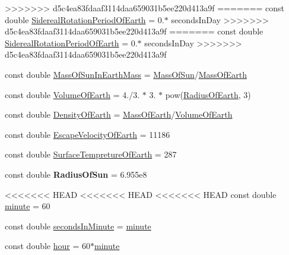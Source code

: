 \begin{DoxyCompactItemize}
>>>>>>> d5c4ea83fdaaf3114daa659031b5ee220d413a9f
=======
const double \hyperlink{namespace_e_g_x_phys_a34a388ac3f9196bb3cdbdbee5ff3cdb7}{Sidereal\+Rotation\+Period\+Of\+Earth} = 0.$\ast$ seconds\+In\+Day
>>>>>>> d5c4ea83fdaaf3114daa659031b5ee220d413a9f
=======
const double \hyperlink{namespace_e_g_x_phys_a34a388ac3f9196bb3cdbdbee5ff3cdb7}{Sidereal\+Rotation\+Period\+Of\+Earth} = 0.$\ast$ seconds\+In\+Day
>>>>>>> d5c4ea83fdaaf3114daa659031b5ee220d413a9f
\item 
const double \hyperlink{namespace_e_g_x_phys_a05709972a6a6089eb968f667ce0bf656}{Mass\+Of\+Sun\+In\+Earth\+Mass} = \hyperlink{namespace_e_g_x_phys_a6e84ae13f1dbcecb215af787bbc12cd6}{Mass\+Of\+Sun}/\hyperlink{namespace_e_g_x_phys_ace4a9d8c0b21215536857f4c1087a4e8}{Mass\+Of\+Earth}
\item 
const double \hyperlink{namespace_e_g_x_phys_a73aaaddeacf5d59643ec5e4a53a1a251}{Volume\+Of\+Earth} = 4./3. $\ast$ 3. $\ast$ pow(\hyperlink{namespace_e_g_x_phys_a11a2d4a914eb43c4095e225358293a45}{Radius\+Of\+Earth}, 3)
\item 
const double \hyperlink{namespace_e_g_x_phys_a2a671e37351b9b7e334385a26a7f7102}{Density\+Of\+Earth} = \hyperlink{namespace_e_g_x_phys_ace4a9d8c0b21215536857f4c1087a4e8}{Mass\+Of\+Earth}/\hyperlink{namespace_e_g_x_phys_a73aaaddeacf5d59643ec5e4a53a1a251}{Volume\+Of\+Earth}
\item 
const double \hyperlink{namespace_e_g_x_phys_a6a8cb7abae15a2f1bbcfd6623f72316c}{Escape\+Velocity\+Of\+Earth} = 11186
\item 
const double \hyperlink{namespace_e_g_x_phys_a942ce2ac76b5df8b08ec7827d3e20b76}{Surface\+Tempreture\+Of\+Earth} = 287
\item 
\mbox{\label{namespace_e_g_x_phys_a983b842cceb4a584787874fc9486384d}} 
const double {\bfseries Radius\+Of\+Sun} = 6.\+955e8
\item 
<<<<<<< HEAD
<<<<<<< HEAD
<<<<<<< HEAD
const double \hyperlink{namespace_e_g_x_phys_ab3a72a63e9c502847d0db88a167dc02b}{minute} = 60
\item 
const double \hyperlink{namespace_e_g_x_phys_a65038e0b58235dc59a44cec16638df35}{seconds\+In\+Minute} = \hyperlink{namespace_e_g_x_phys_ab3a72a63e9c502847d0db88a167dc02b}{minute}
\item 
const double \hyperlink{namespace_e_g_x_phys_a85c64ea70cddbb7e4c96adcc01cef6e2}{hour} = 60$\ast$\hyperlink{namespace_e_g_x_phys_ab3a72a63e9c502847d0db88a167dc02b}{minute}
\item 

\end{DoxyCompactItemize}
